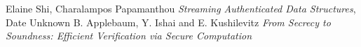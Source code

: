 \documentclass[11pt, letterpaper, oneside]{article}
\begin{document}

\begin{thebibliography}{9}
	 Elaine Shi, Charalampos Papamanthou \emph{Streaming Authenticated Data Structures}, Date Unknown
	 B. Applebaum, Y. Ishai
and E. Kushilevitz \emph{From Secrecy to Soundness:
Efficient Verification via Secure Computation}
	\end{thebibliography}
\end{document}
